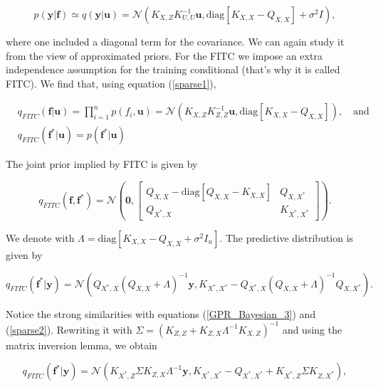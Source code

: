 \documentclass[12pt,a4paper,oneside]{book}
\begin{document}
\begin{equation}
p(\bm{y}|\bm{f}) \simeq q(\bm{y}|\bm{u}) = \mathcal{N}(K_{X,Z} K^{-1}_{U, U} \bm{u}, \text{diag}[K_{X,X}- Q_{X,X}] + \sigma^2 I),
\end{equation}

where one included a diagonal term for the covariance. We can again study it from the view of approximated priors. For the FITC we impose an extra independence assumption for the training  conditional (that's why it is called FITC). We find that, using equation (\ref{sparse1}), 

\begin{equation}
\begin{aligned}
&q_{FITC}(\bm{f}|\bm{u}) = \prod_{i=1}^{n} p(f_i,\bm{u})= \mathcal{N}(K_{X,Z} K^{-1}_{Z,Z} \bm{u} , \text{diag}[K_{X,X} - Q_{X,X}]), \quad \text{and} \quad \\
&q_{FITC}(\bm{f}^{\ast} | \bm{u}) = p(\bm{f}^{\ast}|\bm{u})
\end{aligned}
\end{equation}

The joint prior implied by FITC is given by

\begin{equation}
q_{FITC}(\bm{f},\bm{f}^{\ast}) = 
\mathcal{N} \left( \bm{0}, 
\begin{bmatrix}
    Q_{X,X} - \text{diag}[Q_{X,X} -K_{X,X}] & Q_{X,X^{\ast}}\\
    Q_{X^{\ast},X}  & K_{X^{\ast},X^{\ast}}
\end{bmatrix} 
\right).
\end{equation}

We denote with $\Lambda = \text{diag}[K_{X,X}-Q_{X,X} + \sigma^2 I_n]$. The predictive distribution is given by 

\begin{equation}
q_{FITC} (\bm{f}^{\ast} | \bm{y} ) = \mathcal{N}(Q_{X^{\ast},X}(Q_{X,X} + \Lambda)^{-1}\bm{y}, K_{X^{\ast} ,X^{\ast}} - Q_{X^{\ast},X}(Q_{X,X} + \Lambda)^{-1} Q_{X,X^{\ast}}).
\end{equation}

Notice the strong similarities with equations (\ref{GPR_Bayesian_3}) and (\ref{sparse2}). Rewriting it with $\Sigma = (K_{Z,Z} + K_{Z,X} \Lambda^{-1} K_{X,Z})^{-1}$ and using the matrix inversion lemma, we obtain 

\begin{equation}
\boxed{
q_{FITC} (\bm{f}^{\ast} | \bm{y} ) = \mathcal{N}( K_{X^{\ast},Z} \Sigma K_{Z,X}\Lambda^{-1} \bm{y},   K_{X^{\ast},X^{\ast}} - Q_{X^{\ast},X^{\ast}} + K_{X^{\ast},Z} \Sigma K_{Z,X^{\ast}}) ,}
\end{equation}
\end{document}
